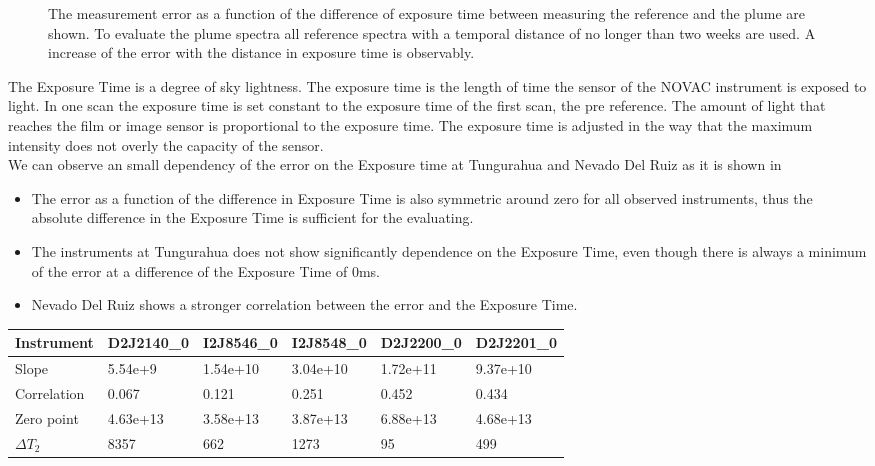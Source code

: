 \documentclass  [
  paper    = a4,
  BCOR     = 10mm,
  twoside,
  fontsize = 12pt,
  fleqn,
  toc      = bibnumbered,
  toc      = listofnumbered,
  numbers  = noendperiod,
  headings = normal,
  listof   = leveldown,
  version  = 3.03
]                                       {scrreprt}
\begin{document}
\begin{figure}
		\caption{The   measurement error as a function of the difference of exposure time between measuring the reference and the plume are shown. To evaluate the plume spectra all reference spectra with a temporal distance of no longer than two weeks are used. A increase of the  error with the distance in exposure time is observably.}
		\label{fig:diffexptime}
	\end{figure}
	The Exposure Time is a degree of sky lightness. The  exposure time is the length of time the sensor of the NOVAC instrument is exposed to light. In one scan the exposure time is set constant to the exposure time of the first scan, the pre reference. The amount of light that reaches the film or image sensor is proportional to the exposure time. The exposure time is adjusted in the way that the maximum intensity does not overly the capacity of the sensor.\\
	We can observe an small dependency of the  error on the Exposure time at Tungurahua and Nevado Del Ruiz as it is shown in 
	\begin{itemize}
		\item The   error as a function of the difference in Exposure Time is also symmetric around zero for all observed instruments, thus the absolute difference in the Exposure Time is sufficient for the evaluating.
		\item The instruments at Tungurahua does not show significantly dependence on the Exposure Time, even though there is always a minimum of the  error at a difference of the Exposure Time of 0ms.
		\item Nevado Del Ruiz shows a stronger correlation between the   error and the Exposure Time.
	\end{itemize}
	\begin{table}[h]
		\begin{tabular}{|p{2cm}|p{2cm}|p{2cm}|p{2cm}|p{2cm}|p{2cm}|}
			Instrument	&D2J2140\_0&I2J8546\_0& I2J8548\_0&D2J2200\_0&D2J2201\_0\\
			\toprule
			Slope& 5.54e+9&1.54e+10 &3.04e+10&1.72e+11&9.37e+10\\
			\midrule
			Correlation&0.067
			&0.121&
			0.251&
			0.452&
			0.434\\
			\midrule
			Zero point&4.63e+13&3.58e+13& 3.87e+13& 6.88e+13& 4.68e+13\\
						\midrule
			$\Delta T_{2}$&8357&662&1273&95&499\\
			\bottomrule
		\end{tabular}
		\label{tab:exptimecalc}
	\end{table}
\end{document}
